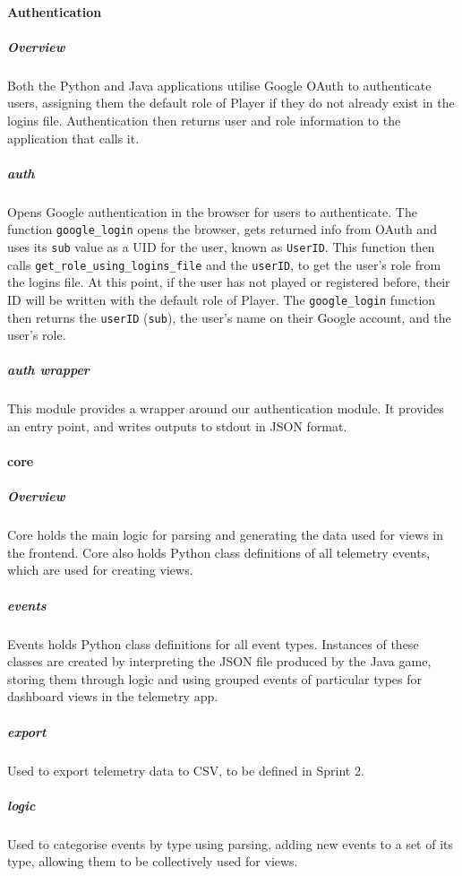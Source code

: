 \paragraph{Authentication}

\subparagraph{Overview}
Both the Python and Java applications utilise Google OAuth to authenticate users, assigning them the default role of Player if they do not already exist in the logins file. Authentication then returns user and role information to the application that calls it.

\subparagraph{auth}
Opens Google authentication in the browser for users to authenticate. The function \texttt{google\_login} opens the browser, gets returned info from OAuth and uses its \texttt{sub} value as a UID for the user, known as \texttt{UserID}. This function then calls \texttt{get\_role\_using\_logins\_file} and the \texttt{userID}, to get the user's role from the logins file. At this point, if the user has not played or registered before, their ID will be written with the default role of Player. The \texttt{google\_login} function then returns the \texttt{userID} (\texttt{sub}), the user's name on their Google account, and the user's role.

\subparagraph{auth wrapper}
This module provides a wrapper around our authentication module. It provides an entry point, and writes outputs to stdout in JSON format.

\paragraph{core}

\subparagraph{Overview}
Core holds the main logic for parsing and generating the data used for views in the frontend. Core also holds Python class definitions of all telemetry events, which are used for creating views.

\subparagraph{events}
Events holds Python class definitions for all event types. Instances of these classes are created by interpreting the JSON file produced by the Java game, storing them through logic and using grouped events of particular types for dashboard views in the telemetry app.

\subparagraph{export}
Used to export telemetry data to CSV, to be defined in Sprint 2.

\subparagraph{logic}
Used to categorise events by type using parsing, adding new events to a set of its type, allowing them to be collectively used for views.

